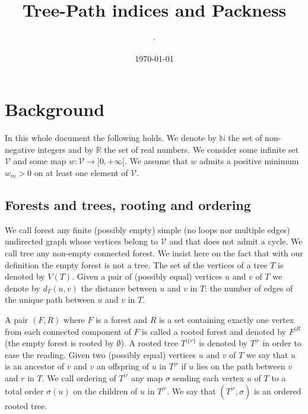\documentclass[11 pt]{modarticle}
\title{Tree-Path indices and Packness}
\date{\today}
\author[1]{$\cdot$}
\newcommand{\cN}{\mathbb{N}}
\newcommand{\cR}{\mathbb{R}}
\newcommand{\vset}{\mathcal{V}}
\newcommand{\wmap}{w}
\newcommand{\wmin}{w_m}
\newcommand{\vsetof}[1]{V(#1)}
\newcommand{\distance}[3]{d_{#3}(#1,#2)}
\newcommand{\rtree}[2]{{#1}^{\lvert #2}}
\newcommand{\ortree}[3]{(\rtree{#1}{#2},{#3})}
\begin{document}
\maketitle
\thispagestyle{empty} %

\begin{abstract}
\end{abstract}

\tableofcontents
	
\pagebreak

\section{Background}

In this whole document the following holds. We denote by $\cN$ the set of non-negative integers and by $\cR$ the set of real numbers. We consider some infinite set $\vset$ and some map $\wmap : \vset \to ]0,+\infty[$. We assume that $\wmap$ admits a positive minimum $\wmin > 0$ on at least one element of $\vset$.

\subsection{Forests and trees, rooting and ordering}

We call forest any finite (possibly empty) simple (no loops nor multiple edges) undirected graph whose vertices belong to $\vset$ and that does not admit a cycle. We call tree any non-empty connected forest. We insist here on the fact that with our definition the empty forest is not a tree. The set of the vertices of a tree $T$ is denoted by $\vsetof{T}$. Given a pair of (possibly equal) vertices $u$ and $v$ of $T$ we denote by $\distance{u}{v}{T}$ the distance between $u$ and $v$ in $T$: the number of edges of the unique path between $u$ and $v$ in $T$.

A pair $(F,R)$ where $F$ is a forest and $R$ is a set containing exactly one vertex from each connected component of $F$  is called a rooted forest and denoted by $\rtree{F}{R}$ (the empty forest is rooted by $\emptyset$). A rooted tree $\rtree{T}{\{r\}}$ is denoted by $\rtree{T}{r}$ in order to ease the reading. Given two (possibly equal) vertices $u$ and $v$ of $T$ we say that $u$ is an ancestor of $v$ and $v$ an offspring of $u$ in $\rtree{T}{r}$ if $u$ lies on the path between $v$ and $r$ in $T$. We call ordering of $\rtree{T}{r}$ any map $\sigma$ sending each vertex $u$ of $T$ to a total order $\sigma(u)$ on the children of $u$ in $\rtree{T}{r}$. We say that $\ortree{T}{r}{\sigma}$ is an ordered rooted tree.
\end{document}
